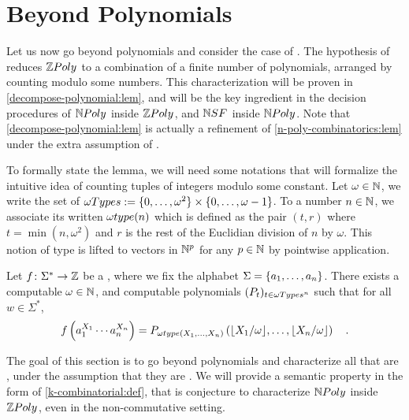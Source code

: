 \section{Beyond Polynomials}
\label{beyond-polynomials:sec}
\label{star-free:sec}

Let us now go beyond polynomials and consider the case of 
. The hypothesis of  reduces
$\ZPoly$ to a combination of a finite number of polynomials, arranged by
counting modulo some numbers. This characterization will be proven in
\cref{decompose-polynomial:lem}, and will be the key ingredient in the decision
procedures of $\NPoly$ inside $\ZPoly$, and $\NSF$ inside $\NPoly$. Note that
\cref{decompose-polynomial:lem} is actually a refinement of
\cref{n-poly-combinatorics:lem} under the extra assumption of
. 

\AP To formally state the lemma, we will need some notations that will
formalize the intuitive idea of counting tuples of integers modulo some
constant. Let $\omega \in \mathbb{N}$, we write the set of  $\ModuloTypes[\omega] \defined \set{0, \dots, \omega^2} \times \set{0,
    \dots, \omega - 1}$. To a number $n \in \mathbb{N}$, we associate its
     written $\moduloType[\omega](n)$ which is defined as the pair
    $(t, r)$ where $t = \min (n, \omega^2)$ and $r$ is the rest of the Euclidian
    division of $n$ by $\omega$. This notion of type is lifted to vectors in
    $\mathbb{N}^p$ for any $p \in \mathbb{N}$ by pointwise application.


\begin{lemma}
    \label{decompose-polynomial:lem}
    Let $f \colon \Sigma^* \to \mathbb{Z}$ be a 
    ,
    where we fix the alphabet $\Sigma = \mathopen{\{} a_1, \dots, a_n \mathclose{\}}$.
    There exists a computable
    $\omega \in \mathbb{N}$,
    and computable 
    polynomials $\seqof{P_{t}}{t \in \ModuloTypes[\omega]^n}$
    such that for all $w \in \Sigma^*$,
    \begin{equation*}
        f\left(a_1^{X_1} \cdots a_n ^{X_n}\right) 
        = P_{\moduloType[\omega](X_1, \dots, X_n)}
        \left(
            \floor{X_1/\omega}, \dots, \floor{X_n/\omega}
        \right)
        \quad .
    \end{equation*}
\end{lemma}


The goal of this section is to go beyond polynomials and characterize all
 that are , under the
assumption that they are . We will provide a semantic property
in the form of \cref{k-combinatorial:def}, that is conjecture to characterize
$\NPoly$ inside $\ZPoly$, even in the non-commutative setting.

